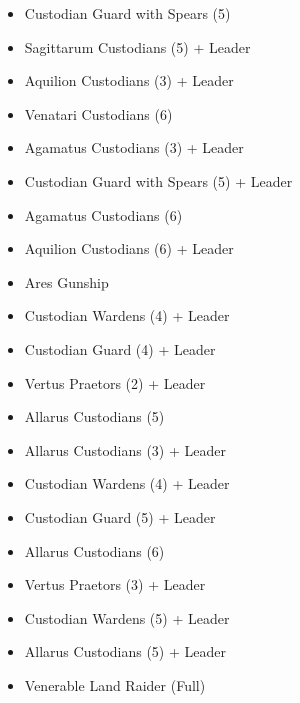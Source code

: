 \documentclass{HordeModeTarot}
\begin{document}
\begin{multicols}{2}
\begin{itemize}[leftmargin=*]
\item[] Custodian Guard with Spears (5)
\item[] Sagittarum Custodians (5) + Leader
\item[] Aquilion Custodians (3) + Leader
\item[] Venatari Custodians (6)
\item[] Agamatus Custodians (3) + Leader
\item[] Custodian Guard with Spears (5) + Leader
\item[] Agamatus Custodians (6)
\item[] Aquilion Custodians (6) + Leader
\item[] Ares Gunship
\item[] Custodian Wardens (4) + Leader
\item[] Custodian Guard (4) + Leader
\item[] Vertus Praetors (2) + Leader
\item[] Allarus Custodians (5)
\item[] Allarus Custodians (3) + Leader
\item[] Custodian Wardens (4) + Leader
\item[] Custodian Guard (5) + Leader
\item[] Allarus Custodians (6)
\item[] Vertus Praetors (3) + Leader
\item[] Custodian Wardens (5) + Leader
\item[] Allarus Custodians (5) + Leader
\item[] Venerable Land Raider (Full)
\end{itemize}


\end{multicols}
\end{document}
